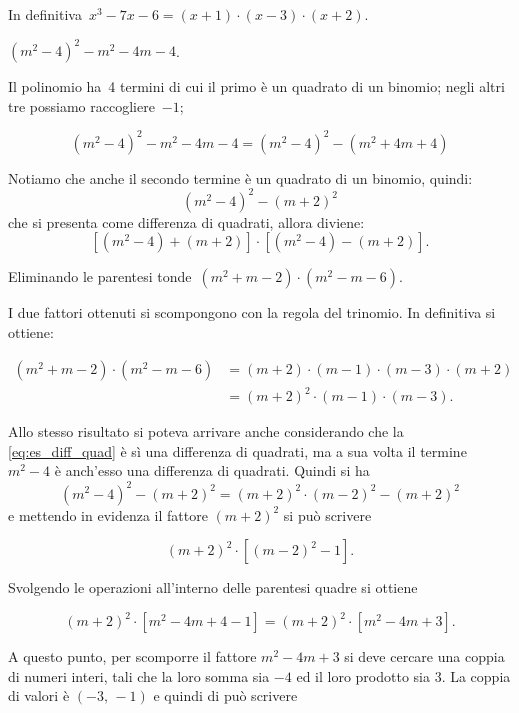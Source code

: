 \begin{exrig}
In definitiva~$x^{{3}}-7x-6=\left(x+1\right)\cdot (x-3)\cdot (x+2)$.

 \begin{esempio}
 $\left(m^{2}-4\right)^{2}-m^{2}-4m-4$.

Il polinomio ha~4 termini di cui il primo è un quadrato di un binomio;
negli altri tre possiamo raccogliere~$-1$;

\begin{equation*}
\left(m^{2}-4\right)^{2}-m^{2}-4m-4=\left(m^{2}-4\right)^{2}-\left(m^{2}+4m+4\right)
\end{equation*}

Notiamo che anche il secondo termine è un quadrato di un binomio, quindi:
\begin{equation}\label{eq:es_diff_quad}
\left(m^{2}-4\right)^{2}-\left(m+2\right)^{2}
\end{equation}
che si presenta come differenza di quadrati, allora diviene:
\[\left[\left(m^{2}-4\right)+\left(m+2\right)\right]\cdot
\left[\left(m^{2}-4\right)-\left(m+2\right)\right].\]

Eliminando le parentesi tonde~$\left(m^{2}+m-2\right)\cdot
\left(m^{2}-m-6\right)$.

I due fattori ottenuti si scompongono con la regola del trinomio. In
definitiva si ottiene:

\begin{align*}
(m^{2}+m-2)\cdot (m^{2}-m-6)&=\left(m+2\right)\cdot\left(m-1\right)\cdot \left(m-3\right)\cdot
\left(m+2\right)\\
&=\left(m+2\right)^{2}\cdot \left(m-1\right)\cdot
\left(m-3\right).
\end{align*}

Allo stesso risultato si poteva arrivare anche considerando che la \ref{eq:es_diff_quad} è sì una differenza di quadrati, ma a sua volta il termine $m^2-4$ è anch'esso una differenza di quadrati. Quindi si ha
\[\left(m^{2}-4\right)^{2}-\left(m+2\right)^{2} = (m+2)^2\cdot (m-2)^2-(m+2)^{2}\]
e mettendo in evidenza il fattore $\left(m+2\right)^{2}$ si può scrivere

\[\left(m+2\right)^{2}\cdot \left[ \left( m-2 \right)^2 -1 \right]. \]

Svolgendo le operazioni all'interno delle parentesi quadre si ottiene

\[\left(m+2\right)^{2}\cdot \left[ m^2-4m+4 -1 \right] = \left(m+2\right)^{2}\cdot \left[ m^2-4m+3 \right]. \]

A questo punto, per scomporre il fattore $m^2-4m+3$ si deve cercare una coppia di numeri interi, tali che la loro somma sia $-4$ ed il loro prodotto sia 3. La coppia di valori è $(-3\text{,~}-1)$ e quindi di può scrivere


\end{esempio}
\end{exrig}
